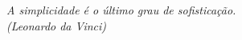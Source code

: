 \documentclass[
	12pt,				%
	openright,			%
	twoside,			%
	a4paper,			%
	english,			%
	french,				%
	spanish,			%
	brazil				%
	]{abntex2}
\begin{document}

%
%

\begin{epigrafe}
	\vspace*{\fill}
	\begin{flushright}
		\textit{A simplicidade é o último grau de sofisticação.\\
			(Leonardo da Vinci)}
	\end{flushright}
\end{epigrafe}

\end{document}
